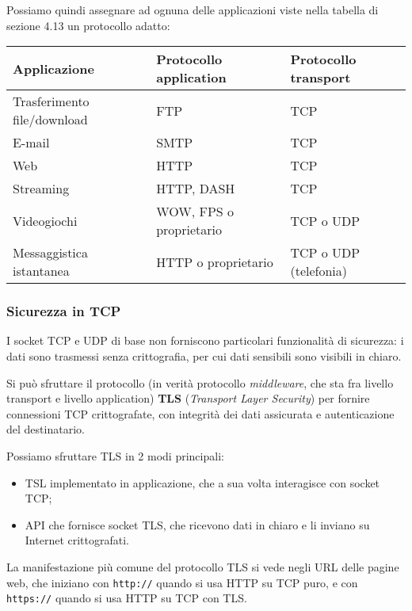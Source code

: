 \documentclass[a4paper,11pt]{article}
\begin{document}
\par\smallskip

Possiamo quindi assegnare ad ognuna delle applicazioni viste nella tabella di sezione 4.13 un protocollo adatto:
\begin{table}[H]
	\center {}
	\begin{tabular} { p{3cm} || p{5cm} | p{5cm} }
		\bfseries Applicazione & \bfseries Protocollo application & \bfseries Protocollo transport \\ 
		\hline
		Trasferimento file/download & FTP & TCP \\
		E-mail & SMTP & TCP \\ 
		Web & HTTP & TCP \\ 
		Streaming & HTTP, DASH & TCP \\ 
		Videogiochi & WOW, FPS o proprietario & TCP o UDP \\ 
		Messaggistica istantanea & HTTP o proprietario & TCP o UDP (telefonia) \\ 
	\end{tabular}
\end{table}

\subsubsection{Sicurezza in TCP}
I socket TCP e UDP di base non forniscono particolari funzionalità di sicurezza: i dati sono trasmessi senza crittografia, per cui dati sensibili sono visibili in chiaro.

Si può sfruttare il protocollo (in verità protocollo \textit{middleware}, che sta fra livello transport e livello application) \textbf{TLS} (\textit{Transport Layer Security}) per fornire connessioni TCP crittografate, con integrità dei dati assicurata e autenticazione del destinatario.

Possiamo sfruttare TLS in 2 modi principali:
\begin{itemize}
	\item TSL implementato in applicazione, che a sua volta interagisce con socket TCP;
	\item API che fornisce socket TLS, che ricevono dati in chiaro e li inviano su Internet crittografati.
\end{itemize}

La manifestazione più comune del protocollo TLS si vede negli URL delle pagine web, che iniziano con \lstinline|http://| quando si usa HTTP su TCP puro, e con \lstinline|https://| quando si usa HTTP su TCP con TLS.
\end{document}
